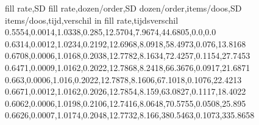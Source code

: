 fill rate,SD fill rate,dozen/order,SD dozen/order,items/doos,SD items/doos,tijd,verschil in fill rate,tijdsverschil
0.5554,0.0014,1.0338,0.285,12.5704,7.9674,44.6805,0.0,0.0
0.6314,0.0012,1.0234,0.2192,12.6968,8.0918,58.4973,0.076,13.8168
0.6708,0.0006,1.0168,0.2038,12.7782,8.1634,72.4257,0.1154,27.7453
0.6471,0.0009,1.0162,0.2022,12.7868,8.2418,66.3676,0.0917,21.6871
0.663,0.0006,1.016,0.2022,12.7878,8.1606,67.1018,0.1076,22.4213
0.6671,0.0012,1.0162,0.2026,12.7854,8.159,63.0827,0.1117,18.4022
0.6062,0.0006,1.0198,0.2106,12.7416,8.0648,70.5755,0.0508,25.895
0.6626,0.0007,1.0174,0.2048,12.7732,8.166,380.5463,0.1073,335.8658
